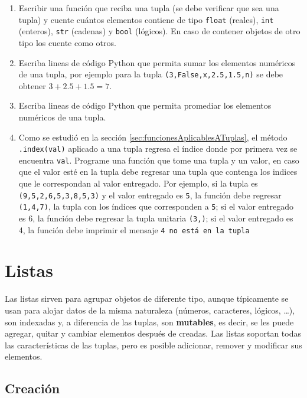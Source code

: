 \documentclass[
]{book}
\providecommand{\tightlist}{%
  \setlength{\itemsep}{0pt}\setlength{\parskip}{0pt}}
\theoremstyle{definition}
\theoremstyle{definition}
\theoremstyle{definition}
\theoremstyle{definition}
\theoremstyle{remark}
\begin{document}
\begin{enumerate}
\def\labelenumi{\arabic{enumi}.}
\tightlist
\item
  Escribir una función que reciba una tupla (se debe verificar que sea una tupla) y cuente cuántos elementos contiene de tipo \texttt{float} (reales), \texttt{int} (enteros), \texttt{str} (cadenas) y \texttt{bool} (lógicos). En caso de contener objetos de otro tipo los cuente como otros.
\item
  Escriba lineas de código Python que permita sumar los elementos numéricos de una tupla, por ejemplo para la tupla \texttt{(3,False,\textquotesingle{}x\textquotesingle{},2.5,1.5,\textquotesingle{}n\textquotesingle{})} se debe obtener \(3+2.5+1.5=7\).
\item
  Escriba lineas de código Python que permita promediar los elementos numéricos de una tupla.
\item
  Como se estudió en la sección \ref{sec:funcionesAplicablesATuplas}, el método \texttt{.index(val)} aplicado a una tupla regresa el índice donde por primera vez se encuentra \texttt{val}. Programe una función que tome una tupla y un valor, en caso que el valor esté en la tupla debe regresar una tupla que contenga los indices que le correspondan al valor entregado. Por ejemplo, si la tupla es \texttt{(9,5,2,6,5,3,8,5,3)} y el valor entregado es \texttt{5}, la función debe regresar \texttt{(1,4,7)}, la tupla con los índices que corresponden a \texttt{5}; si el valor entregado es 6, la función debe regresar la tupla unitaria \texttt{(3,)}; si el valor entregado es 4, la función debe imprimir el mensaje \texttt{4\ no\ está\ en\ la\ tupla}
\end{enumerate}

\hypertarget{sec:listas}{%
\section{Listas}\label{sec:listas}}

Las listas sirven para agrupar objetos de diferente tipo, aunque típicamente se usan para alojar datos de la misma naturaleza (números, caracteres, lógicos, \ldots), son indexadas y, a diferencia de las tuplas, son \textbf{mutables}, es decir, se les puede agregar, quitar y cambiar elementos después de creadas. Las listas soportan todas las características de las tuplas, pero es posible adicionar, remover y modificar sus elementos.

\hypertarget{creaciuxf3n}{%
\subsection{Creación}\label{creaciuxf3n}}
\end{document}
